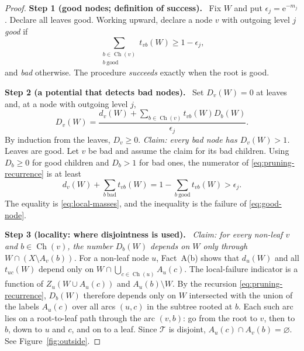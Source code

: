 \documentclass[11pt]{article}
\numberwithin{equation}{section}
\newcommand{\TT}{\mathcal T}
\newcommand{\ch}{\operatorname{Ch}}
\newcommand{\ee}{\mathrm e}
\newcommand{\step}[2]{\medskip\noindent\textbf{Step #1 (#2).}\ }
\begin{document}
\begin{proof}
\step{1}{good nodes; definition of success}
Fix $W$ and put $\epsilon_j=\ee^{-m_j}$. Declare all leaves good.
Working upward, declare a node $v$ with outgoing level $j$ \emph{good}
if
\begin{equation}\label{eq:good-node}
 \sum_{\substack{b\in\ch(v)\\b\ \mathrm{good}}}t_{vb}(W)
 \ge1-\epsilon_j ,
\end{equation}
and \emph{bad} otherwise. The procedure \emph{succeeds} exactly when
the root is good.

\step{2}{a potential that detects bad nodes}
Set $D_v(W)=0$ at leaves and, at a node with outgoing level $j$,
\begin{equation}\label{eq:pruning-recurrence}
 D_v(W)=\frac{d_v(W)+\sum_{b\in\ch(v)}t_{vb}(W)D_b(W)}{\epsilon_j}.
\end{equation}
By induction from the leaves, $D_v\ge0$. \emph{Claim: every bad node
has $D_v(W)>1$.} Leaves are good. Let $v$ be bad and assume the claim
for its bad children. Using $D_b\ge0$ for good children and $D_b>1$
for bad ones, the numerator of \eqref{eq:pruning-recurrence} is at
least
\[
 d_v(W)+\sum_{b\ \mathrm{bad}}t_{vb}(W)
 =1-\sum_{b\ \mathrm{good}}t_{vb}(W)>\epsilon_j .
\]
The equality is \eqref{eq:local-masses}, and the inequality is the
failure of \eqref{eq:good-node}.

\step{3}{locality: where disjointness is used}
\emph{Claim: for every non-leaf $v$ and $b\in\ch(v)$, the number
$D_b(W)$ depends on $W$ only through $W\cap(X\setminus A_v(b))$.}
For a non-leaf node $u$, Fact~A(b) shows that $d_u(W)$ and all
$t_{uc}(W)$ depend only on $W\cap\bigcup_{c\in\ch(u)}A_u(c)$. The
local-failure indicator is a function of $Z_u(W\cup A_u(c))$ and
$A_u(b)\setminus W$. By the recursion \eqref{eq:pruning-recurrence},
$D_b(W)$ therefore depends only on $W$ intersected with the union of
the labels $A_u(c)$ over all arcs $(u,c)$ in the subtree rooted at
$b$. Each such arc lies on a root-to-leaf path through the arc
$(v,b)$: go from the root to $v$, then to $b$, down to $u$ and $c$,
and on to a leaf. Since $\TT$ is disjoint,
$A_u(c)\cap A_v(b)=\varnothing$. See Figure~\ref{fig:outside}.


\end{proof}
\end{document}
